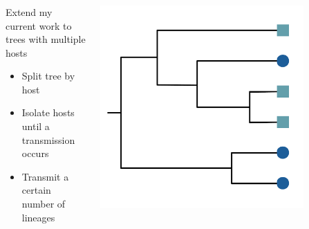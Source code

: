 \documentclass[aspectratio=169]{beamer}
\begin{document}
\begin{frame} \frametitle{\insertsection}
    
    \begin{columns}

        \begin{column}{0.6\textwidth}

            Extend my current work to trees with multiple hosts

            \begin{itemize}
                \item{Split tree by host}
                \item{Isolate hosts until a transmission occurs}
                \item{Transmit a certain number of lineages}
            \end{itemize}
            
        \end{column}

        \begin{column}{0.4\textwidth}

            \centering\includegraphics[width=0.8\textwidth]{images/tree-blank-notime}

        \end{column}

    \end{columns}

\end{frame}
\end{document}
